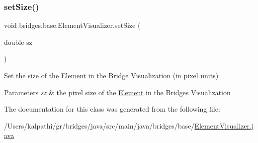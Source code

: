 \subsubsection{\texorpdfstring{setSize()}{setSize()}}
{\footnotesize\ttfamily void bridges.\+base.\+Element\+Visualizer.\+set\+Size (\begin{DoxyParamCaption}\item[{double}]{sz }\end{DoxyParamCaption})}

Set the size of the \mbox{\hyperlink{classbridges_1_1base_1_1_element}{Element}} in the Bridge Visualization (in pixel units)


\begin{DoxyParams}{Parameters}
{\em sz} & the pixel size of the \mbox{\hyperlink{classbridges_1_1base_1_1_element}{Element}} in the Bridges Visualization \\
\hline
\end{DoxyParams}


The documentation for this class was generated from the following file\+:\begin{DoxyCompactItemize}
\item 
/\+Users/kalpathi/gr/bridges/java/src/main/java/bridges/base/\mbox{\hyperlink{_element_visualizer_8java}{Element\+Visualizer.\+java}}\end{DoxyCompactItemize}
